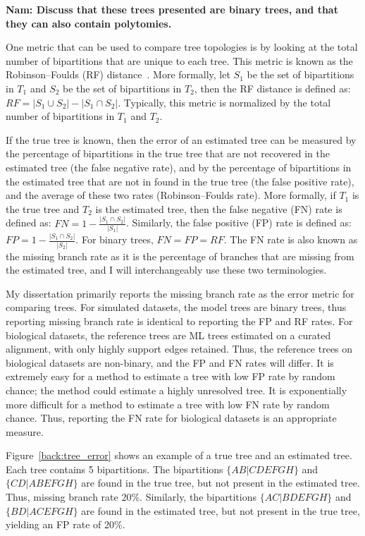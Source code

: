 \textbf{Nam:  Discuss that these trees presented are binary trees, and that they can also contain polytomies.}

One metric that can be used to compare tree topologies is by looking at the total number of bipartitions that are unique to each tree.  This metric is known as the Robinson–Foulds (RF) distance~\cite{RF}.  More formally, let $S_1$ be the set of bipartitions in $T_1$ and $S_2$ be the set of bipartitions in $T_2$, then the RF distance is defined as: $RF=|S_1\cup S_2|-|S_1\cap S_2|$. Typically, this metric is normalized by the total number of bipartitions in $T_1$ and $T_2$.  

If the true tree is known, then the error of an estimated tree can be measured by the percentage of bipartitions in the true tree that are not recovered in the estimated tree (the false negative rate), and by the percentage of bipartitions in the estimated tree that are not in found in the true tree (the false positive rate), and the average of these two rates (Robinson–Foulds rate).  More formally, if $T_1$ is the true tree and $T_2$ is the estimated tree, then the false negative (FN) rate is defined as: $FN=1-\frac{|S_1\cap S_2|}{|S_1|}$.  Similarly, the false positive (FP) rate is defined as: $FP=1-\frac{|S_1\cap S_2|}{|S_2|}$.  For binary trees, $FN=FP=RF$.  The FN rate is also known as the missing branch rate as it is the percentage of branches that are missing from the estimated tree, and I will interchangeably use these two terminologies.  

My dissertation primarily reports the missing branch rate as the error metric for comparing trees.  For simulated datasets, the model trees are binary trees, thus reporting missing branch rate is identical to reporting the FP and RF rates.  For biological datasets, the reference trees are ML trees estimated on a curated alignment, with only highly support edges retained.  Thus, the reference trees on biological datasets are non-binary, and the FP and FN rates will differ.  It is extremely easy for a method to estimate a tree with low FP rate by random chance; the method could estimate a highly unresolved tree.  It is exponentially more difficult for a method to estimate a tree with low FN rate by random chance.  Thus, reporting the FN rate for biological datasets is an appropriate measure. 

Figure~\ref{back:tree_error} shows an example of a true tree and an estimated tree.  Each tree contains 5 bipartitions.  The bipartitions $\{AB|CDEFGH\}$ and $\{CD|ABEFGH\}$ are found in the true tree, but not present in the estimated tree.  Thus, missing branch rate 20\%.  Similarly, the bipartitions $\{AC|BDEFGH\}$ and $\{BD|ACEFGH\}$ are found in the estimated tree, but not present in the true tree, yielding an FP rate of 20\%.

